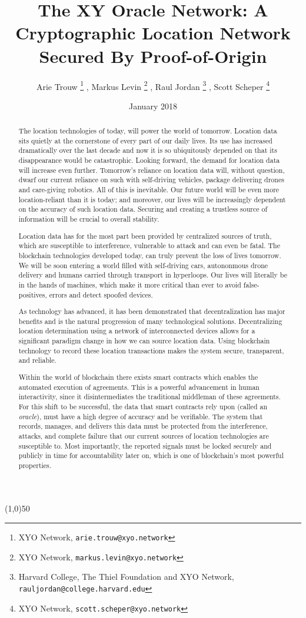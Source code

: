 \documentclass{article}
\title {The XY Oracle Network: A Cryptographic Location Network Secured By Proof-of-Origin}
\author{
	Arie Trouw
		\thanks{XYO Network, \texttt{arie.trouw@xyo.network}}
	, Markus Levin
		\thanks{XYO Network, \texttt{markus.levin@xyo.network}}
	, Raul Jordan
		\thanks{Harvard College, The Thiel Foundation and XYO Network, \texttt{rauljordan@college.harvard.edu}}
	, Scott Scheper
		\thanks{XYO Network, \texttt{scott.scheper@xyo.network}}
}
\date{January 2018}
\begin{document}
\maketitle

\begin{center}
\line(1,0){50}
\end{center}


\begin{abstract}
The location technologies of today, will power the world of tomorrow. Location data sits quietly at the cornerstone of every part of our daily lives. Its use has increased dramatically over the last decade and now it is so ubiquitously depended on that its disappearance would be catastrophic. Looking forward, the demand for location data will increase even further. Tomorrow's reliance on location data will, without question, dwarf our current reliance on such with  self-driving vehicles, package delivering drones and care-giving robotics. All of this is inevitable. Our future world will be even more location-reliant than it is today; and moreover, our lives will be increasingly dependent on the accuracy of such location data. Securing and creating a trustless source of information will be crucial to overall stability. 

Location data has for the most part been provided by centralized sources of truth, which are susceptible to interference, vulnerable to attack and can even be fatal. The blockchain technologies developed today, can truly prevent the loss of lives tomorrow. We will be soon entering a world filled with self-driving cars, autononmous drone delivery and humans carried through transport in hyperloops. Our lives will literally be in the hands of machines, which make it more critical than ever to avoid false-positives, errors and detect spoofed devices.

As technology has advanced, it has been demonstrated that decentralization has major benefits and is the natural progression of many technological solutions. Decentralizing location determination using a network of interconnected devices allows for a significant paradigm change in how we can source location data. Using blockchain technology to record these location transactions makes the system secure, transparent, and reliable. 

Within the world of blockchain there exists smart contracts which enables the automated execution of agreements. This is a powerful advancement in human interactivity, since it disintermediates the traditional middleman of these agreements. For this shift to be successful, the data that smart contracts rely upon (called an \textit{oracle}), must have a high degree of accuracy and be verifiable. The system that records, manages, and delivers this data must be protected from the interference, attacks, and complete failure that our current sources of location technologies are susceptible to. Most importantly, the reported signals must be locked securely and publicly in time for accountability later on, which is one of blockchain's most powerful properties.


\end{abstract}
\end{document}
